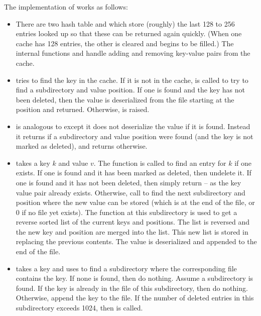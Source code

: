 The implementation of {} works as follows:
\begin{itemize}
\item There are two hash table {} and {}
which store (roughly) the last 128 to 256 entries looked up
so that these can be returned again quickly.
(When one cache has 128 entries, the other is cleared and begins
to be filled.)
The internal functions {} and {}
handle adding and removing key-value pairs from the cache.
\item {} tries to find the key in the cache.
If it is not in the cache, {} is called to 
try to find a subdirectory and value position.
If one is found and the key has not been deleted, then
the value is deserialized from the {} file starting at the position
and returned.
Otherwise, {} is raised.
\item {} is analogous to {} except it
does not deserialize the value if it is found.
Instead it returns {} if a subdirectory and value position were found
(and the key is not marked as deleted),
and returns {} otherwise.
\item {} takes a key $k$ and value $v$.
The function {} is called to find an entry for $k$ if one exists.
If one is found and it has been marked as deleted, then undelete it.
If one is found and it has not been deleted, then simply return -- as the
key value pair already exists.
Otherwise, call {} to find the next subdirectory
and position where the new value can be stored (which is at the end of the {} file,
or $0$ if no {} file yet exists).
The function {} at this subdirectory is used
to get a reverse sorted list of the current keys and positions.
The list is reversed and the new key and position are merged into the list.
This new list is stored in {} replacing the previous contents.
The value is deserialized and appended to the end of the {} file.
\item {} takes a key and uses {} to find a subdirectory
where the corresponding {} file contains the key.
If none is found, then do nothing.
Assume a subdirectory is found.
If the key is already in the {} file of this subdirectory, then do nothing.
Otherwise, append the key to the {} file.
If the number of deleted entries in this subdirectory exceeds 1024, then {} is called.
\end{itemize}


